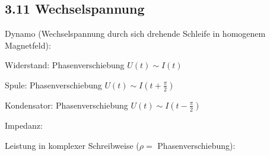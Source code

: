 \subsection*{3.11 Wechselspannung}
    Dynamo (Wechselspannung durch sich drehende Schleife in homogenem Magnetfeld):

    Widerstand: Phasenverschiebung $U(t) \sim I(t)$

    Spule: Phasenverschiebung $U(t) \sim I(t + \frac{\pi}{2})$

    Kondensator: Phasenverschiebung $U(t) \sim I(t - \frac{\pi}{2})$

    Impedanz:

    Leistung in komplexer Schreibweise ($\rho = $ Phasenverschiebung):
